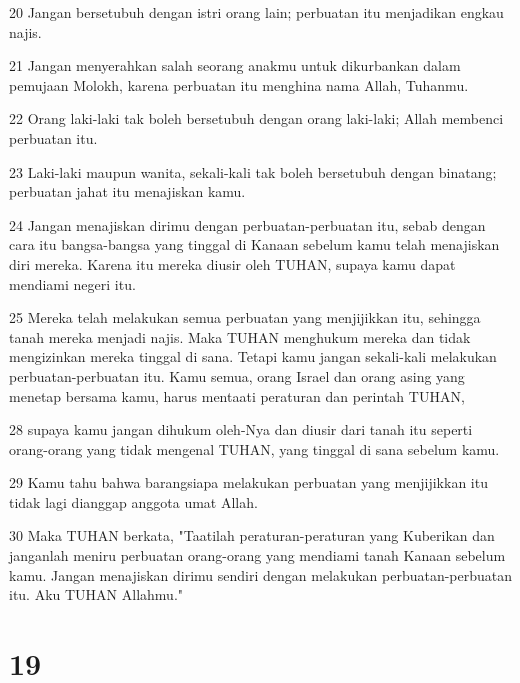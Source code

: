 \par 20 Jangan bersetubuh dengan istri orang lain; perbuatan itu menjadikan engkau najis.
\par 21 Jangan menyerahkan salah seorang anakmu untuk dikurbankan dalam pemujaan Molokh, karena perbuatan itu menghina nama Allah, Tuhanmu.
\par 22 Orang laki-laki tak boleh bersetubuh dengan orang laki-laki; Allah membenci perbuatan itu.
\par 23 Laki-laki maupun wanita, sekali-kali tak boleh bersetubuh dengan binatang; perbuatan jahat itu menajiskan kamu.
\par 24 Jangan menajiskan dirimu dengan perbuatan-perbuatan itu, sebab dengan cara itu bangsa-bangsa yang tinggal di Kanaan sebelum kamu telah menajiskan diri mereka. Karena itu mereka diusir oleh TUHAN, supaya kamu dapat mendiami negeri itu.
\par 25 Mereka telah melakukan semua perbuatan yang menjijikkan itu, sehingga tanah mereka menjadi najis. Maka TUHAN menghukum mereka dan tidak mengizinkan mereka tinggal di sana. Tetapi kamu jangan sekali-kali melakukan perbuatan-perbuatan itu. Kamu semua, orang Israel dan orang asing yang menetap bersama kamu, harus mentaati peraturan dan perintah TUHAN,
\par 28 supaya kamu jangan dihukum oleh-Nya dan diusir dari tanah itu seperti orang-orang yang tidak mengenal TUHAN, yang tinggal di sana sebelum kamu.
\par 29 Kamu tahu bahwa barangsiapa melakukan perbuatan yang menjijikkan itu tidak lagi dianggap anggota umat Allah.
\par 30 Maka TUHAN berkata, "Taatilah peraturan-peraturan yang Kuberikan dan janganlah meniru perbuatan orang-orang yang mendiami tanah Kanaan sebelum kamu. Jangan menajiskan dirimu sendiri dengan melakukan perbuatan-perbuatan itu. Aku TUHAN Allahmu."

\chapter{19}

